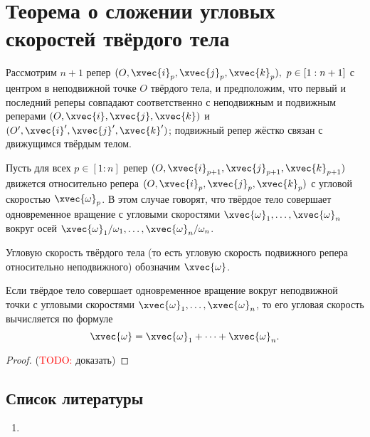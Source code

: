 \section{Теорема о сложении угловых скоростей твёрдого тела}

Рассмотрим $n+1$ репер $(O, \xvec{i}_p, \xvec{j}_p, \xvec{k}_p),~p \in [1:n+1]$
с центром в неподвижной точке $O$ твёрдого тела, и предположим, что первый и
последний реперы совпадают соответственно с неподвижным и подвижным реперами
$(O, \xvec{i}, \xvec{j}, \xvec{k})$ и $(O', \xvec{i}', \xvec{j}', \xvec{k}')$;
подвижный репер жёстко связан с движущимся твёрдым телом.

Пусть для всех $p \in [1:n]$ репер $(O, \xvec{i}_{p+1}, \xvec{j}_{p+1},
\xvec{k}_{p+1})$ движется относительно репера $(O, \xvec{i}_p, \xvec{j}_p,
\xvec{k}_p)$ с угловой скоростью $\xvec{\omega}_p$. В этом случае говорят, что
твёрдое тело совершает одновременное вращение с угловыми скоростями
$\xvec{\omega}_1, \dots, \xvec{\omega}_n$ вокруг осей
$\xvec{\omega}_1/\omega_1, \dots, \xvec{\omega}_n/\omega_n$.

Угловую скорость твёрдого тела (то есть угловую скорость подвижного репера
относительно неподвижного) обозначим $\xvec{\omega}$.

\begin{theorem}
  Если твёрдое тело совершает одновременное вращение вокруг неподвижной точки с
  угловыми скоростями $\xvec{\omega}_1, \dots, \xvec{\omega}_n$, то его угловая
  скорость вычисляется по формуле
  \begin{equation}
    \xvec{\omega} = \xvec{\omega}_1 + \cdots + \xvec{\omega}_n.
  \end{equation}
\end{theorem}

\begin{proof}
  (\textcolor{red}{TODO:} доказать)
\end{proof}

\subsection{Список литературы}
\begin{enumerate}
  \item \cite{lectures}
\end{enumerate}

